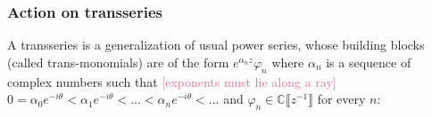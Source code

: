\documentclass{article}
\newcommand{\maps}{\colon}
\newcommand{\C}{\mathbb{C}}
\newcommand{\laplace}{\mathcal{L}}
\newcommand{\borel}{\mathcal{B}}
\theoremstyle{definition}
\theoremstyle{plain}
\begin{document}




\subsubsection{Action on transseries}\label{sec:action_transseries}
%
\color{DarkTurquoise}
\color{RoyalBlue}
A transseries is a generalization of usual power series, whose building blocks (called trans-monomials) are of the form $e^{\alpha_n z}\varphi_n$ where $\alpha_n$ is a sequence of complex numbers such that \textcolor{PaleVioletRed}{[exponents must lie along a ray]} $0=\alpha_0 e^{-i\theta}< \alpha_1 e^{-i\theta}<...<\alpha_n e^{-i\theta}<...$ and $\varphi_n\in\C\llbracket z^{-1}\rrbracket$ for every $n$: 
\end{document}
